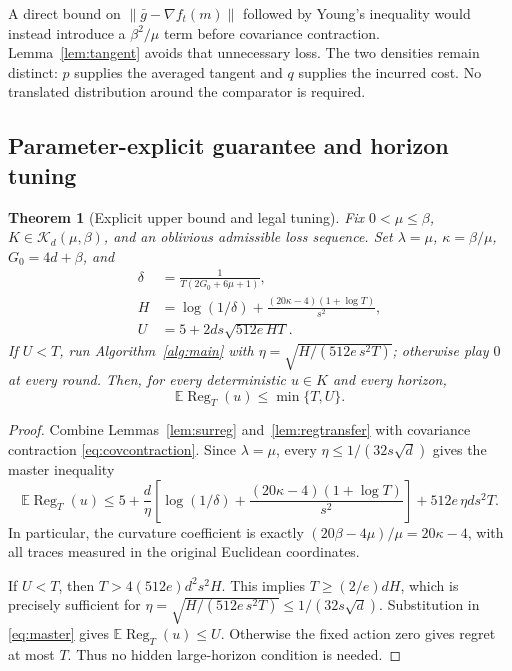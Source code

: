 \documentclass[11pt]{article}
\numberwithin{equation}{section}
\newcommand{\E}{\mathbb E}
\newcommand{\Reg}{\operatorname{Reg}}
\newcommand{\norm}[1]{\left\|#1\right\|}
\newcommand{\cK}{\mathcal K}
\newtheorem{theorem}{Theorem}[section]
\theoremstyle{definition}
\theoremstyle{remark}
\begin{document}
A direct bound on $\norm{\bar g-\nabla f_t(m)}$ followed by Young's inequality
would instead introduce a $\beta^2/\mu$ term before covariance contraction.
Lemma~\ref{lem:tangent} avoids that unnecessary loss. The two densities remain
distinct: $p$ supplies the averaged tangent and $q$ supplies the incurred cost.
No translated distribution around the comparator is required.

\subsection{Parameter-explicit guarantee and horizon tuning}
\begin{theorem}[Explicit upper bound and legal tuning]\label{thm:parameter}
Fix $0<\mu\leq\beta$, $K\in\cK_d(\mu,\beta)$, and an oblivious admissible
loss sequence. Set $\lambda=\mu$, $\kappa=\beta/\mu$, $G_0=4d+\beta$, and
\begin{align}
 \delta&=\frac1{T(2G_0+6\mu+1)},\nonumber\\
 H&=\log(1/\delta)+\frac{(20\kappa-4)(1+\log T)}{s^2},\label{eq:H}\\
 U&=5+2ds\sqrt{512e\,HT}.\label{eq:U}
\end{align}
If $U<T$, run Algorithm~\ref{alg:main} with
$\eta=\sqrt{H/(512e\,s^2T)}$; otherwise play $0$ at every round. Then, for
every deterministic $u\in K$ and every horizon,
\begin{equation}\label{eq:explicitupper}
 \E\Reg_T(u)\leq\min\{T,U\}.
\end{equation}
\end{theorem}
\begin{proof}
Combine Lemmas~\ref{lem:surreg} and~\ref{lem:regtransfer} with covariance
contraction \eqref{eq:covcontraction}. Since $\lambda=\mu$, every
$\eta\leq1/(32s\sqrt d)$ gives the master inequality
\begin{equation}\label{eq:master}
 \E\Reg_T(u)\leq5+
 \frac d\eta\left[\log(1/\delta)
                  +\frac{(20\kappa-4)(1+\log T)}{s^2}\right]
                 +512e\,\eta ds^2T.
\end{equation}
In particular, the curvature coefficient is exactly
$(20\beta-4\mu)/\mu=20\kappa-4$, with all traces measured in the original
Euclidean coordinates.

If $U<T$, then $T>4(512e)d^2s^2H$. This implies $T\geq(2/e)dH$, which is
precisely sufficient for
$\eta=\sqrt{H/(512e\,s^2T)}\leq1/(32s\sqrt d)$.
Substitution in \eqref{eq:master} gives $\E\Reg_T(u)\leq U$.
Otherwise the fixed action zero gives regret at most $T$. Thus no hidden
large-horizon condition is needed.
\end{proof}
\end{document}
